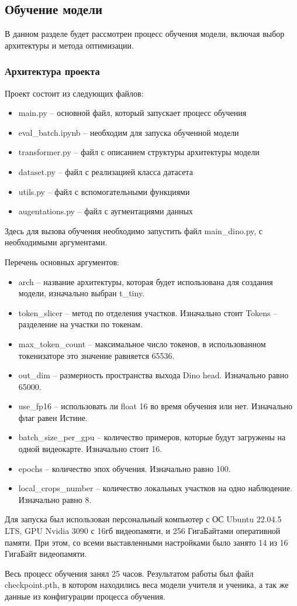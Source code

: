 \documentclass[../part_3.tex]{subfiles}
\begin{document}
\subsection{Обучение модели}
\par В данном разделе будет рассмотрен процесс обучения модели, включая выбор архитектуры и метода оптимизации.
\subsubsection{Архитектура проекта}
\par Проект состоит из следующих файлов:
\begin{itemize}
    \item main.py -- основной файл, который запускает процесс обучения
    \item eval\_batch.ipynb -- необходим для запуска обученной модели
    \item transformer.py -- файл с описанием структуры архитектуры модели 
    \item dataset.py -- файл с реализацией класса датасета
    \item utils.py -- файл с вспомогательными функциями
    \item augentations.py -- файл с аугментациями данных
\end{itemize}
\par Здесь для вызова обучения необходимо запустить файл main\_dino.py, с необходимыми аргументами.
\par Перечень основных аргументов:
\begin{itemize}
    \item arch -- название архитектуры, которая будет использована для создания модели, изначально выбран t\_tiny.
    \item token\_slicer -- метод по отделения участков. Изначально стоит Tokens -- разделение на участки по токенам.
    \item max\_token\_count -- максимальное число токенов, в использованном токенизаторе это значение равняется 65536.
    \item out\_dim -- размерность пространства выхода Dino head. Изначально равно 65000.
    \item use\_fp16 -- использовать ли float 16 во время обучения или нет. Изначально флаг равен Истине.
    \item batch\_size\_per\_gpu -- количество примеров, которые будут загружены на одной видеокарте. Изначально стоит 16.
    \item epochs -- количество эпох обучения. Изначально равно 100.
    \item local\_crops\_number -- количество локальных участков на одно наблюдение. Изначально равно 8.
\end{itemize}
\par Для запуска был использован персональный компьютер с ОС Ubuntu 22.04.5 LTS, GPU Nvidia 3090 с 16гб видеопамяти, и 256 ГигаБайтами оперативной памяти. При этом, со всеми выставленными настройками было занято 14 из 16 ГигаБайт видеопамяти.
\par Весь процесс обучения занял 25 часов. Результатом работы был файл checkpoint.pth, в котором находились веса модели учителя и ученика, а так же данные из конфигурации процесса обучения.
\end{document}
